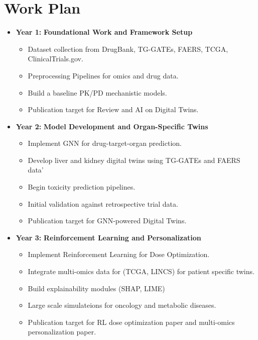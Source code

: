 \chapter*{Work Plan}

\begin{itemize}
    \item \textbf{Year 1:} \textbf{Foundational Work and Framework Setup} 
        \begin{itemize}
            \item Dataset collection from DrugBank, TG-GATEs, FAERS, TCGA, ClinicalTrials.gov.
            \item Preprocessing Pipelines for omics and drug data.
            \item Build a baseline PK/PD mechanistic models.
            \item Publication target for Review and AI on Digital Twins.
        \end{itemize}
    \item \textbf{Year 2:} \textbf{Model Development and Organ-Specific Twins}
        \begin{itemize}
            \item Implement GNN for drug-target-organ prediction.
            \item Develop liver and kidney digital twins using TG-GATEs and FAERS data'
            \item Begin toxicity prediction pipelines.
            \item Initial validation against retrospective trial data.
            \item Publication target for GNN-powered Digital Twins.
        \end{itemize}
    \item \textbf{Year 3:} \textbf{Reinforcement Learning and Personalization}
        \begin{itemize}
            \item Implement Reinforcement Learning for Dose Optimization.
            \item Integrate multi-omics data for (TCGA, LINCS) for patient specific twins.
            \item Build explainability modules (SHAP, LIME)
            \item Large scale simulateions for oncology and metabolic diseases.
            \item Publication target for RL dose optimization paper and multi-omics personalization paper.

\end{itemize}
\end{itemize}

